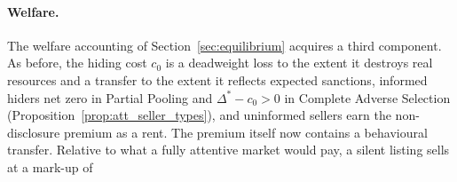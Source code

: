 \paragraph{Welfare.}
The welfare accounting of Section~\ref{sec:equilibrium} acquires a third component. As before, the hiding cost $c_0$ is a deadweight loss to the extent it destroys real resources and a transfer to the extent it reflects expected sanctions, informed hiders net zero in Partial Pooling and $\Delta^*-c_0>0$ in Complete Adverse Selection (Proposition~\ref{prop:att_seller_types}), and uninformed sellers earn the non-disclosure premium as a rent. The premium itself now contains a behavioural transfer. Relative to what a fully attentive market would pay, a silent listing sells at a mark-up of
